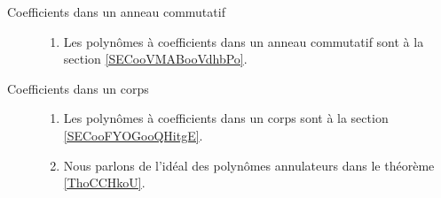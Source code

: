 
\begin{description}
    \item[Coefficients dans un anneau commutatif]

        \begin{enumerate}
            \item
Les polynômes à coefficients dans un anneau commutatif  sont à la section \ref{SECooVMABooVdhbPo}.
        \end{enumerate}
        

    \item[Coefficients dans un corps]
        \begin{enumerate}
            \item
                
Les polynômes à coefficients dans un corps sont à la section \ref{SECooFYOGooQHitgE}.
\item
Nous parlons de l'idéal des polynômes annulateurs dans le théorème \ref{ThoCCHkoU}.
        \end{enumerate}
\end{description}



